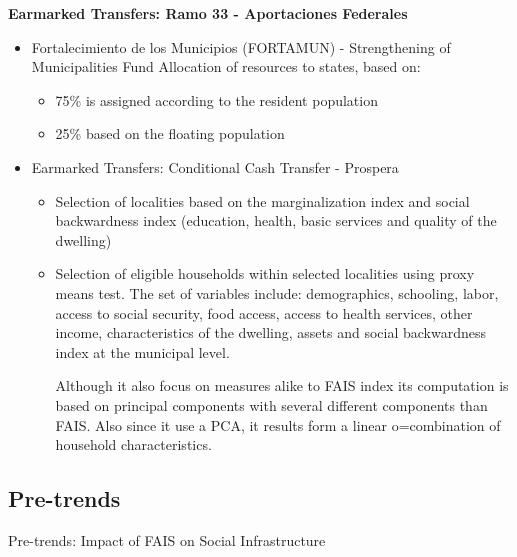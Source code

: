 \documentclass[dv_diss_main.tex]{subfiles}
\begin{document}
{\bf Earmarked Transfers: Ramo 33 - Aportaciones Federales}
\begin{itemize}

\item 	Fortalecimiento de los Municipios (FORTAMUN) - Strengthening of Municipalities Fund
Allocation of resources to states, based on:
   \begin{itemize}
   \item 75\% is assigned according to the resident population
   \item 25\% based on the floating population 
        
   \end{itemize}

\item Earmarked Transfers: Conditional Cash Transfer - Prospera
   \begin{itemize}
   \item Selection of localities based on the marginalization index and social backwardness index (education, health, basic services and quality of the dwelling)
   \item Selection of eligible households within selected localities using proxy means test. The set of variables include: demographics, schooling, labor, access to social security, food access, access to health services, other income, characteristics of the dwelling, assets and social backwardness index at the municipal level. 
   
   Although it also focus on measures alike to FAIS index its computation is based on principal components with several different components than FAIS. Also since it use a PCA, it results form a linear o=combination of household characteristics.  

   \end{itemize}

\end{itemize}

\newpage
\subsection{Pre-trends}\label{ap:c}



\begin{table}[H]
	\centering
	\small
	\caption{Pre-trends: Impact of FAIS on Social Infrastructure}
	\label{trends_inf}
	\resizebox{11cm}{!}{
		
				}		
\parbox{\textwidth}{\small 
\vspace{2eX}
\footnotesize	
 \maintable
 \trend 
}
\end{table}
\end{document}
